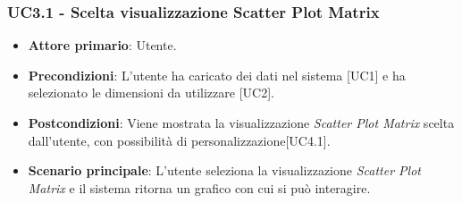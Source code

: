 \subsubsection{UC3.1 - Scelta visualizzazione Scatter Plot Matrix}
\begin{itemize}
	\item \textbf{Attore primario}: Utente.
	\item \textbf{Precondizioni}: L'utente ha caricato dei dati nel sistema [UC1] e ha selezionato le dimensioni da utilizzare [UC2].
	\item \textbf{Postcondizioni}: Viene mostrata la visualizzazione \textit{Scatter Plot Matrix} scelta dall'utente, con possibilità di personalizzazione[UC4.1].
	\item \textbf{Scenario principale}: L'utente seleziona la visualizzazione \textit{Scatter Plot Matrix} e il sistema ritorna un grafico con cui si può interagire.
\end{itemize}